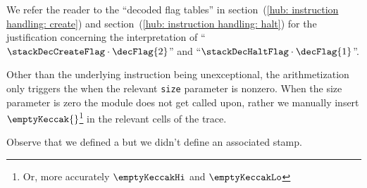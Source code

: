 \saNote{} 
We refer the reader to the ``decoded flag tables'' in
section~(\ref{hub: instruction handling: create}) and section~(\ref{hub: instruction handling: halt})
for the justification concerning the interpretation of ``$\stackDecCreateFlag \cdot \decFlag{2}$'' and ``$\stackDecHaltFlag   \cdot \decFlag{1}$''.

\saNote{}
Other than the underlying instruction being unexceptional, the arithmetization only triggers the \stackHashInfoFlag{} when the relevant \texttt{size} parameter is nonzero.
When the size parameter is zero the \hashInfoMod{} module does not get called upon, rather we manually insert $\emptyKeccak{}$\footnote{Or, more accurately $\emptyKeccakHi$ and $\emptyKeccakLo$} in the relevant cells of the trace.

\saNote{}
Observe that we defined a \stackHashInfoFlag{} but we didn't define an associated stamp.
